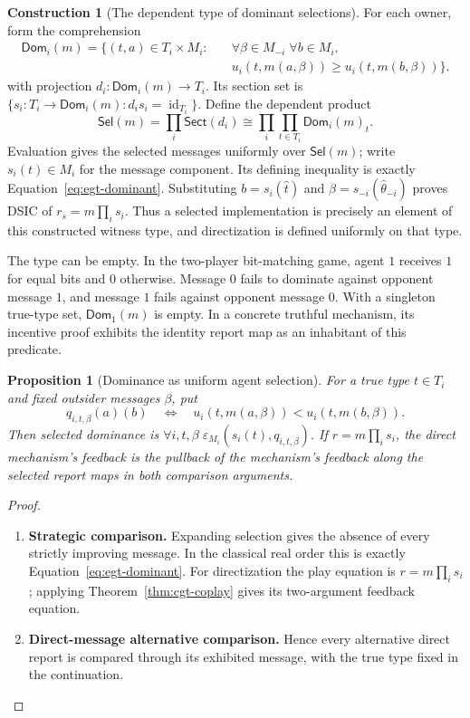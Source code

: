 \documentclass[11pt,a4paper]{article}
\numberwithin{equation}{section}
\newtheorem{proposition}[theorem]{Proposition}
\theoremstyle{definition}
\newtheorem{construction}[construction]{Construction}
\theoremstyle{remark}
\theoremstyle{plain}
\begin{document}
\begin{construction}[The dependent type of dominant selections]
\label{con:egt-dominant-selection-type}
For each owner, form the comprehension
\[
\begin{aligned}
 \mathsf{Dom}_i(m)=\{(t,a)\in T_i\times M_i:\quad
 &\forall\beta\in M_{-i}\;\forall b\in M_i,\\[-2pt]
 &u_i(t,m(a,\beta))\geq u_i(t,m(b,\beta))\}.
\end{aligned}
\]
with projection $d_i:\mathsf{Dom}_i(m)\to T_i$. Its section set is
$\{s_i:T_i\to\mathsf{Dom}_i(m):d_i s_i=\operatorname{id}_{T_i}\}$.
Define the dependent product
\[
 \mathsf{Sel}(m)
 =\prod_i\mathsf{Sect}(d_i)
 \cong\prod_i\prod_{t\in T_i}\mathsf{Dom}_i(m)_t.
\]
Evaluation gives the selected messages uniformly over $\mathsf{Sel}(m)$;
write $s_i(t)\in M_i$ for the message component. Its defining inequality is
exactly Equation~\eqref{eq:egt-dominant}. Substituting
$b=s_i(\widehat t)$ and $\beta=s_{-i}(\widehat\theta_{-i})$ proves DSIC of
$r_s=m\prod_i s_i$. Thus a selected implementation is precisely an element
of this constructed witness type, and directization is defined uniformly
on that type.

The type can be empty. In the two-player bit-matching game, agent $1$
receives $1$ for equal bits and $0$ otherwise. Message $0$ fails to dominate
against opponent message $1$, and message $1$ fails against opponent message
$0$. With a singleton true-type set, $\mathsf{Dom}_1(m)$ is empty.
In a concrete truthful mechanism, its incentive proof exhibits the
identity report map as an inhabitant of this predicate.
\end{construction}

\begin{proposition}[Dominance as uniform agent selection]
\label{prop:cgt-dominance-selection}
For a true type $t\in T_i$ and fixed outsider messages $\beta$, put
\[
 q_{i,t,\beta}(a)(b)
 \quad\Longleftrightarrow\quad
 u_i(t,m(a,\beta))<u_i(t,m(b,\beta)).
\]
Then selected dominance is
$\forall i,t,\beta\;\varepsilon_{M_i}(s_i(t),q_{i,t,\beta})$.
If $r=m\prod_i s_i$, the direct mechanism's feedback is the pullback
of the mechanism's feedback along the selected report maps in both
comparison arguments.
\end{proposition}
\begin{proof}
\leavevmode
\begin{enumerate}[label=\textup{(\arabic*)},leftmargin=*,itemsep=4pt,topsep=3pt]
  \item \textbf{Strategic comparison.} Expanding selection gives the absence of every strictly improving
message. In the classical real order this is exactly
Equation~\eqref{eq:egt-dominant}. For directization the play equation is
$r=m\prod_i s_i$; applying
Theorem~\ref{thm:cgt-coplay} gives its two-argument feedback equation.
  \item \textbf{Direct-message alternative comparison.} Hence every alternative direct report is compared through its exhibited
message, with the true type fixed in the continuation.
\end{enumerate}
\end{proof}
\end{document}
